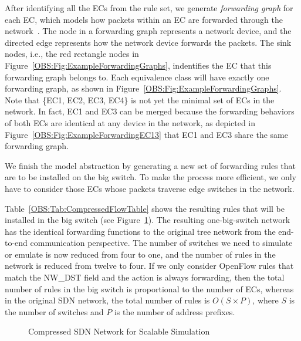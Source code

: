 After identifying all the ECs from the rule set, we generate \textit{forwarding graph} for each EC, which models how packets within an EC are forwarded through the network~\cite{Veriflow}.
The node in a forwarding graph represents a network device, and the directed edge represents how the network device forwards the packets.
The sink nodes, i.e., the red rectangle nodes in Figure~\ref{OBS:Fig:ExampleForwardingGraphs}, indentifies the EC that this forwarding graph belongs to.
Each equivalence class will have exactly one forwarding graph, as shown in Figure~\ref{OBS:Fig:ExampleForwardingGraphs}.
Note that \{EC1, EC2, EC3, EC4\} is not yet the minimal set of ECs in the network.
In fact, EC1 and EC3 can be merged because the forwarding behaviors of both ECs are identical at any device in the network,
as depicted in Figure~\ref{OBS:Fig:ExampleForwardingEC13} that EC1 and EC3 share the same forwarding graph.

We finish the model abstraction by generating a new set of forwarding rules that are to be installed on the big switch.
To make the process more efficient, we only have to consider those ECs whose packets traverse edge switches in the network.

Table~\ref{OBS:Tab:CompressedFlowTable} shows the resulting rules that will be installed in the big switch (see Figure~\ref{OBS:Fig:ExampleBigSwitch}).
The resulting one-big-switch network has the identical forwarding functions to the original tree network from the end-to-end communication perspective.
The number of switches we need to simulate or emulate is now reduced from four to one, and the number of rules in the network is reduced from twelve to four.
If we only consider OpenFlow rules that match the NW\_DST field and the action is always forwarding,
then the total number of rules in the big switch is proportional to the number of ECs,
whereas in the original SDN network, the total number of rules is $O(S\times P)$,
where $S$ is the number of switches and $P$ is the number of address prefixes.

\begin{figure}[t]
\centering
{}
\caption{Compressed SDN Network for Scalable Simulation}
\label{OBS:Fig:ExampleBigSwitch}
\end{figure}
